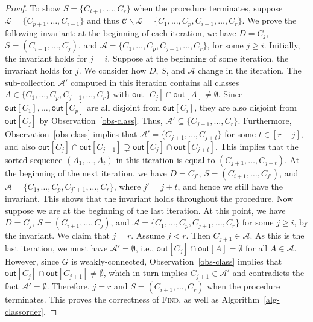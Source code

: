\documentclass[english]{lipics-v2021}
\begin{document}
\begin{proof}
To show $S = \{C_{i+1},\dots,C_r\}$ when the procedure terminates, suppose $\mathcal{L} = \{C_{p+1},\dots,C_{i-1}\}$ and thus $\mathcal{C} \backslash \mathcal{L} = \{C_1,\dots,C_p,C_{i+1},\dots,C_r\}$.
We prove the following invariant: at the beginning of each iteration, we have $D = C_j$, $S = (C_{i+1},\dots,C_j)$, and $\mathcal{A} = \{C_1,\dots,C_p,C_{j+1},\dots,C_r\}$, for some $j \geq i$.
Initially, the invariant holds for $j = i$.
Suppose at the beginning of some iteration, the invariant holds for $j$.
We consider how $D$, $S$, and $\mathcal{A}$ change in the iteration.
The sub-collection $\mathcal{A}'$ computed in this iteration contains all classes $A \in \{C_1,\dots,C_p,C_{j+1},\dots,C_r\}$ with $\mathsf{out}[C_j] \cap \mathsf{out}[A] \neq \emptyset$.
Since $\mathsf{out}[C_1],\dots,\mathsf{out}[C_p]$ are all disjoint from $\mathsf{out}[C_i]$, they are also disjoint from $\mathsf{out}[C_j]$ by Observation~\ref{obs-class}.
Thus, $\mathcal{A}' \subseteq \{C_{j+1},\dots,C_r\}$.
Furthermore, Observation~\ref{obs-class} implies that $\mathcal{A}' = \{C_{j+1},\dots,C_{j+t}\}$ for some $t \in [r-j]$, and also $\mathsf{out}[C_j] \cap \mathsf{out}[C_{j+1}] \supsetneq \mathsf{out}[C_j] \cap \mathsf{out}[C_{j+t}]$.
This implies that the sorted sequence $(A_1,\dots,A_t)$ in this iteration is equal to $(C_{j+1},\dots,C_{j+t})$.
At the beginning of the next iteration, we have $D = C_{j'}$, $S = (C_{i+1},\dots,C_{j'})$, and $\mathcal{A} = \{C_1,\dots,C_p,C_{j'+1},\dots,C_r\}$, where $j' = j+t$, and hence we still have the invariant.
This shows that the invariant holds throughout the procedure.
Now suppose we are at the beginning of the last iteration.
At this point, we have $D = C_j$, $S = (C_{i+1},\dots,C_j)$, and $\mathcal{A} = \{C_1,\dots,C_p,C_{j+1},\dots,C_r\}$ for some $j \geq i$, by the invariant.
We claim that $j = r$.
Assume $j < r$.
Then $C_{j+1} \in \mathcal{A}$.
As this is the last iteration, we must have $\mathcal{A}' = \emptyset$, i.e., $\mathsf{out}[C_j] \cap \mathsf{out}[A] = \emptyset$ for all $A \in \mathcal{A}$.
However, since $G$ is weakly-connected, Observation~\ref{obs-class} implies that $\mathsf{out}[C_j] \cap \mathsf{out}[C_{j+1}] \neq \emptyset$, which in turn implies $C_{j+1} \in \mathcal{A}'$ and contradicts the fact $\mathcal{A}' = \emptyset$.
Therefore, $j = r$ and $S = (C_{i+1},\dots,C_r)$ when the procedure terminates.
This proves the correctness of \textsc{Find}, as well as Algorithm~\ref{alg-classorder}.


\end{proof}
\end{document}
